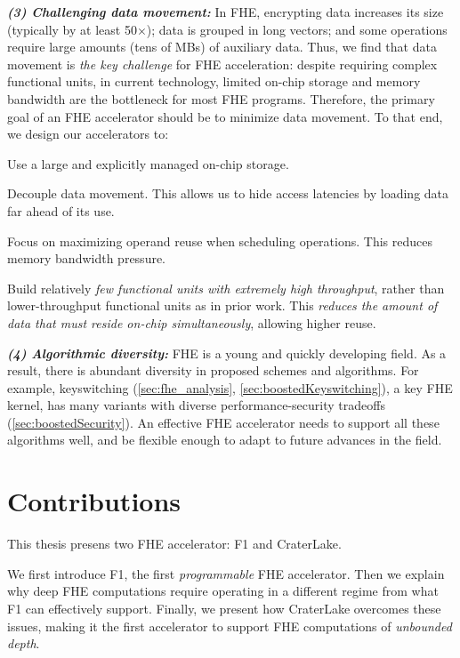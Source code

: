 \noindent \textbf{\emph{(3) Challenging data movement:}}
In FHE, encrypting data increases its size (typically by at least 50$\times$);
data is grouped in long vectors; and some operations require large amounts
(tens of MBs) of auxiliary data. Thus, we find that data movement is \emph{the
key challenge} for FHE acceleration: despite requiring complex functional
units, in current technology, limited on-chip storage and memory bandwidth are
the bottleneck for most FHE programs. Therefore, the primary goal of an FHE
accelerator should be to minimize data movement. To that end, we design our
accelerators to:
\begin{compactenum}
\item Use a large and explicitly managed on-chip storage.
\item Decouple data movement. This allows us to hide access latencies by
    loading data far ahead of its use.
\item Focus on maximizing operand reuse when scheduling operations. This reduces
    memory bandwidth pressure.
\item Build relatively \emph{few functional units with extremely high
    throughput}, rather than lower-throughput functional units as in prior
    work. This \emph{reduces the amount of data that must reside on-chip
    simultaneously}, allowing higher reuse.
\end{compactenum}

\noindent \textbf{\emph{(4) Algorithmic diversity:}}
FHE is a young and quickly developing field. As a result, there is abundant
diversity in proposed schemes and algorithms. For example, keyswitching
(\autoref{sec:fhe_analysis}, \autoref{sec:boostedKeyswitching}), a key FHE
kernel, has many variants with diverse performance-security tradeoffs
(\autoref{sec:boostedSecurity}). An effective FHE accelerator needs to support
all these algorithms well, and be flexible enough to adapt to future advances
in the field.

\section{Contributions}
\label{sec:contributions}

This thesis presens two FHE accelerator: F1 and CraterLake.

We first introduce F1, the first \emph{programmable} FHE
accelerator. Then we explain why deep FHE computations require operating in a
different regime from what F1 can effectively support. Finally, we present how
CraterLake overcomes these issues, making it the first accelerator to support
FHE computations of \emph{unbounded depth}.

